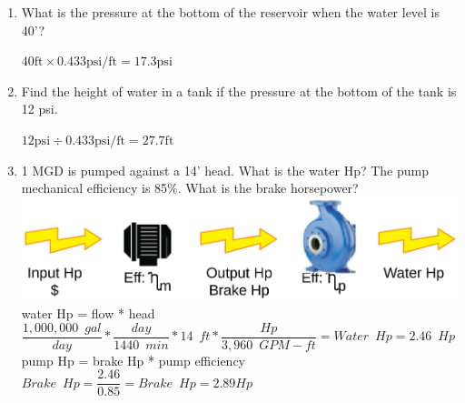 \documentclass{article}
\begin{document}
\begin{enumerate}
\item What is the pressure at the bottom of the reservoir when the water level is 40'?

$40 \mathrm{ft} \times 0.433 \mathrm{psi} / \mathrm{ft}=17.3 \mathrm{psi}$

\vspace{0.4cm}

\item Find the height of water in a tank if the pressure at the bottom of the tank is 12 psi.

$12 \mathrm{psi} \div 0.433 \mathrm{psi} / \mathrm{ft}=27.7 \mathrm{ft}$\\

\vspace{0.3cm}

\item 1 MGD is pumped against a 14’ head.  What is the water Hp?  The pump mechanical efficiency is 85\%.  What is the brake horsepower?\\
\vspace{0.4cm}
\vspace{0.4cm}\includegraphics[scale=0.08]{PumpProblem}\\
\vspace{0.2cm}
water Hp = flow * head\\
\vspace{0.4cm}
$\dfrac{1,000,000 \enspace gal}{day}*\dfrac{day}{1440 \enspace min}*14 \enspace ft*\dfrac{Hp}{3,960 \enspace GPM-ft}=\boxed{Water \enspace Hp = 2.46 \enspace Hp}$\\
\vspace{0.4cm}
pump Hp = brake Hp * pump efficiency\\
\vspace{0.4cm}
$Brake \enspace Hp = \dfrac{2.46}{0.85}=\boxed{Brake \enspace Hp=2.89Hp}$\\
\vspace{0.4cm}


\end{enumerate}
\end{document}
